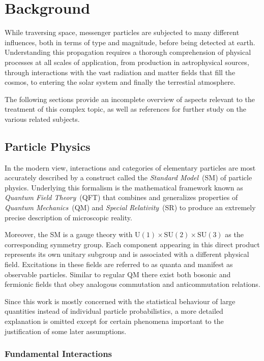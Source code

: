 \chapter{Background}
\label{ch:background}

While traversing space, messenger particles are subjected to many different influences, both in terms of type and magnitude, before being
detected at earth. Understanding this propagation requires a thorough comprehension of physical processes at all scales of application,
from production in astrophysical sources, through interactions with the vast radiation and matter fields that fill the cosmos, to entering
the solar system and finally the terrestial atmosphere.

The following sections provide an incomplete overview of aspects relevant to the treatment of this complex topic, as well as references
for further study on the various related subjects.

\section{Particle Physics}
\label{sec:particle}

In the modern view, interactions and categories of elementary particles are most accurately described by a construct called the
\emph{Standard Model}~(SM) of particle physics. Underlying this formalism is the mathematical framework known as
\emph{Quantum Field Theory}~(QFT) that combines and generalizes properties of \emph{Quantum Mechanics}~(QM) and
\emph{Special Relativity}~(SR) to produce an extremely precise description of microscopic reality.

Moreover, the SM is a gauge theory with $\text{U}(1) \times \text{SU}(2) \times \text{SU}(3)$ as the corresponding symmetry group.
Each component appearing in this direct product represents its own unitary subgroup and is associated with a different physical field.
Excitations in these fields are referred to as quanta and manifest as observable particles. Similar to regular QM there exist both
bosonic and fermionic fields that obey analogous commutation and anticommutation relations.

Since this work is mostly concerned with the statistical behaviour of large quantities instead of individual particle probabilistics,
a more detailed explanation is omitted except for certain phenomena important to the justification of some later assumptions.

\subsection{Fundamental Interactions}
\label{sub:interactions}

